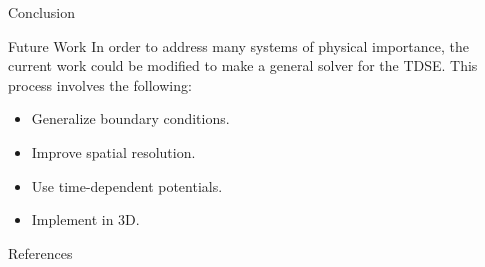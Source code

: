 \documentclass[final]{beamer}
\newlength{\onecolwid}
\begin{document}
\begin{frame}[t]
\begin{columns}[t]
\begin{column}{\onecolwid}
\begin{block}{Conclusion}
\end{block}


\begin{block}{Future Work}
In order to address many systems of physical importance, the current work could be modified to make a general solver for the TDSE. This process involves the following:
\begin{itemize}
\item Generalize boundary conditions.
\item Improve spatial resolution.
\item Use time-dependent potentials.
\item Implement in 3D.
\end{itemize}

\end{block}


\begin{block}{References}

\nocite{*} %
\small{
\vspace{0.75in}}

\end{block}







\end{column}
\end{columns}
\end{frame}
\end{document}

